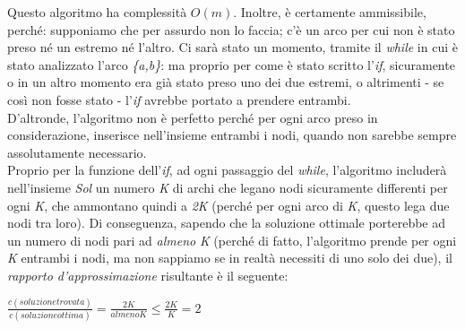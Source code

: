 Questo algoritmo ha complessità $O(m)$. Inoltre, è certamente ammissibile, perché: supponiamo che per assurdo non lo faccia; c'è un arco per cui non è stato preso né un estremo né l'altro. Ci sarà stato un momento, tramite il \textit{while} in cui è stato analizzato l'arco \textit{\{a,b\}}: ma proprio per come è stato scritto l'\textit{if}, sicuramente o in un altro momento era già stato preso uno dei due estremi, o altrimenti - se così non fosse stato - l'\textit{if} avrebbe portato a prendere entrambi. \\
D'altronde, l'algoritmo non è perfetto perché per ogni arco preso in considerazione, inserisce nell'insieme entrambi i nodi, quando non sarebbe sempre assolutamente necessario. \\
Proprio per la funzione dell'\textit{if}, ad ogni passaggio del \textit{while}, l'algoritmo includerà nell'insieme \textit{Sol} un numero \textit{K} di archi che legano nodi sicuramente differenti per ogni \textit{K}, che ammontano quindi a \textit{2K} (perché per ogni arco di \textit{K}, questo lega due nodi tra loro). Di conseguenza, sapendo che la soluzione ottimale porterebbe ad un numero di nodi pari ad \textit{almeno} \textit{K} (perché di fatto, l'algoritmo prende per ogni \textit{K} entrambi i nodi, ma non sappiamo se in realtà necessiti di uno solo dei due), il \textit{rapporto d'approssimazione} risultante è il seguente:
\begin{center}
	$\frac{c(soluzione trovata)}{c(soluzione ottima)} = \frac{2K}{almeno K} \leq \frac{2K}{K} = 2$
\end{center}